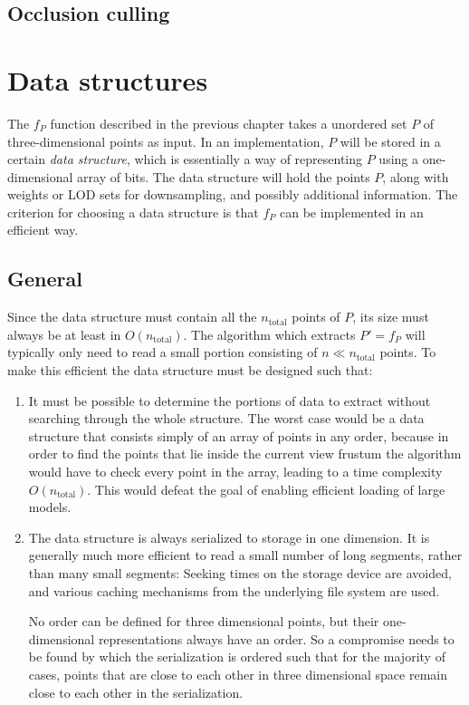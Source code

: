 \documentclass[a4paper,10pt,abstracton,notitlepage]{scrreprt}
\begin{document}
\section{Occlusion culling}


\chapter{Data structures}
The $f_{P}$ function described in the previous chapter takes a unordered set $P$ of three-dimensional points as input. In an implementation, $P$ will be stored in a certain \emph{data structure}, which is essentially a way of representing $P$ using a one-dimensional array of bits. The data structure will hold the points $P$, along with weights or LOD sets for downsampling, and possibly additional information. The criterion for choosing a data structure is that $f_{P}$ can be implemented in an efficient way.

\section{General}
Since the data structure must contain all the $n_{\text{total}}$ points of $P$, its size must always be at least in $O(n_{\text{total}})$. The algorithm which extracts $P' = f_{P}$ will typically only need to read a small portion consisting of $n \ll n_{\text{total}}$ points. To make this efficient the data structure must be designed such that:
\begin{enumerate}
\item It must be possible to determine the portions of data to extract without searching through the whole structure. The worst case would be a data structure that consists simply of an array of points in any order, because in order to find the points that lie inside the current view frustum the algorithm would have to check every point in the array, leading to a time complexity $O(n_{\text{total}})$. This would defeat the goal of enabling efficient loading of large models.
\item The data structure is always serialized to storage in one dimension. It is generally much more efficient to read a small number of long segments, rather than many small segments: Seeking times on the storage device are avoided, and various caching mechanisms from the underlying file system are used.

No order can be defined for three dimensional points, but their one-dimensional representations always have an order. So a compromise needs to be found by which the serialization is ordered such that for the majority of cases, points that are close to each other in three dimensional space remain close to each other in the serialization.
\end{enumerate}
\end{document}
